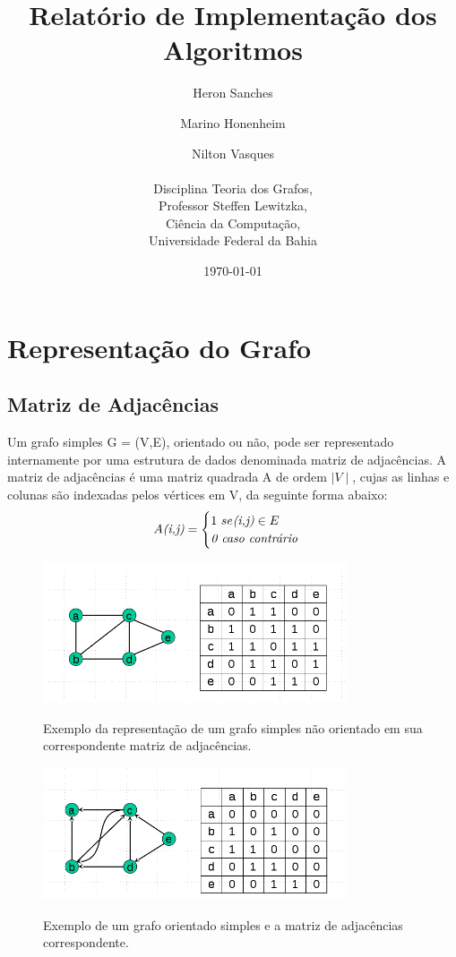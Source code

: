 \documentclass[a4paper,12pt]{article}
\begin{document}
\title{Relatório de Implementação dos Algoritmos}
\author{Heron Sanches \and Marino Honenheim \and Nilton Vasques\\\\
	Disciplina Teoria dos Grafos,\\
	Professor Steffen Lewitzka,\\
	Ciência da Computação,\\
	Universidade Federal da Bahia}
\date{\today}
\maketitle


\section{Representação do Grafo}
\subsection{Matriz de Adjacências}
Um grafo simples G = (V,E), orientado ou não, pode ser representado internamente por uma estrutura de dados denominada matriz de adjacências. A matriz de adjacências é uma matriz quadrada A de ordem $\mid V\mid$, cujas as linhas e colunas são indexadas pelos vértices em V, da seguinte forma abaixo:
\[A\emph{(i,j)} = \begin{cases} 1\  se \emph{(i,j)} \in E \\ \emph{0 caso contrário} \end{cases}\]

\begin{figure}[h!]
	\caption{Exemplo da representação de um grafo simples não orientado em sua correspondente matriz de adjacências.\cite{slideDCC}}
	\centering
	\includegraphics[width=0.8\textwidth]{matrix1}
	\label{fig:matrix1_fig}
\end{figure}

\begin{figure}[h!]
	\caption{Exemplo de um grafo orientado simples e a matriz de adjacências correspondente.\cite{slideDCC}}
	\centering
	\includegraphics[width=0.8\textwidth]{matrix2}
	\label{fig:matrix2_fig}
\end{figure}
\end{document}
